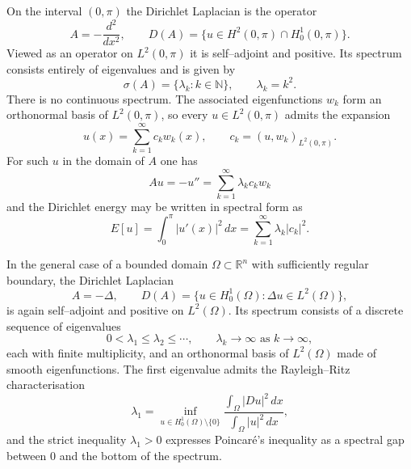 \documentclass[12pt,a4paper]{article}
\theoremstyle{plain}
\theoremstyle{definition}
\theoremstyle{remark}
\theoremstyle{remark}
\begin{document}
On the interval $(0,\pi)$ the Dirichlet Laplacian is the operator
\[
A = -\frac{d^2}{dx^2}, \qquad
D(A) = \{u\in H^2(0,\pi)\cap H_0^1(0,\pi)\}.
\]
Viewed as an operator on $L^2(0,\pi)$ it is self--adjoint and positive. Its
spectrum consists entirely of eigenvalues and is given by
\[
\sigma(A) = \{\lambda_k : k\in\mathbb{N}\},
\qquad \lambda_k = k^2.
\]
There is no continuous spectrum. The associated eigenfunctions $w_k$ form an
orthonormal basis of $L^2(0,\pi)$, so every $u\in L^2(0,\pi)$ admits the
expansion
\[
u(x) = \sum_{k=1}^\infty c_k w_k(x), \qquad
c_k = (u,w_k)_{L^2(0,\pi)}.
\]
For such $u$ in the domain of $A$ one has
\[
Au = -u'' = \sum_{k=1}^\infty \lambda_k c_k w_k
\]
and the Dirichlet energy may be written in spectral form as
\[
E[u] = \int_0^\pi |u'(x)|^2\,dx
= \sum_{k=1}^\infty \lambda_k |c_k|^2.
\]

In the general case of a bounded domain $\Omega\subset\mathbb{R}^n$ with
sufficiently regular boundary, the Dirichlet Laplacian
\[
A = -\Delta, \qquad
D(A) = \{u\in H_0^1(\Omega):\Delta u\in L^2(\Omega)\},
\]
is again self--adjoint and positive on $L^2(\Omega)$. Its spectrum consists of a
discrete sequence of eigenvalues
\[
0 < \lambda_1 \le \lambda_2 \le \cdots, \qquad
\lambda_k \to \infty \text{ as } k\to\infty,
\]
each with finite multiplicity, and an orthonormal basis of $L^2(\Omega)$ made
of smooth eigenfunctions. The first eigenvalue admits the Rayleigh--Ritz
characterisation
\[
\lambda_1
= \inf_{u\in H_0^1(\Omega)\setminus\{0\}}
\frac{\displaystyle\int_\Omega |Du|^2\,dx}
{\displaystyle\int_\Omega |u|^2\,dx},
\]
and the strict inequality $\lambda_1>0$ expresses Poincar\'e's inequality as a
spectral gap between $0$ and the bottom of the spectrum.
\end{document}
